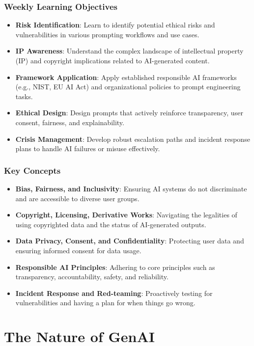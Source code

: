\documentclass{beamer}
\begin{document}
\begin{frame}
    \frametitle{Weekly Learning Objectives}
    \begin{itemize}
        \item \textbf{Risk Identification}: Learn to identify potential ethical risks and vulnerabilities in various prompting workflows and use cases.
        \item \textbf{IP Awareness}: Understand the complex landscape of intellectual property (IP) and copyright implications related to AI-generated content.
        \item \textbf{Framework Application}: Apply established responsible AI frameworks (e.g., NIST, EU AI Act) and organizational policies to prompt engineering tasks.
        \item \textbf{Ethical Design}: Design prompts that actively reinforce transparency, user consent, fairness, and explainability.
        \item \textbf{Crisis Management}: Develop robust escalation paths and incident response plans to handle AI failures or misuse effectively.
    \end{itemize}
\end{frame}

\begin{frame}
    \frametitle{Key Concepts}
    \begin{itemize}
        \item \textbf{Bias, Fairness, and Inclusivity}: Ensuring AI systems do not discriminate and are accessible to diverse user groups.
        \item \textbf{Copyright, Licensing, Derivative Works}: Navigating the legalities of using copyrighted data and the status of AI-generated outputs.
        \item \textbf{Data Privacy, Consent, and Confidentiality}: Protecting user data and ensuring informed consent for data usage.
        \item \textbf{Responsible AI Principles}: Adhering to core principles such as transparency, accountability, safety, and reliability.
        \item \textbf{Incident Response and Red-teaming}: Proactively testing for vulnerabilities and having a plan for when things go wrong.
    \end{itemize}
\end{frame}

\section{The Nature of GenAI}
\end{document}
